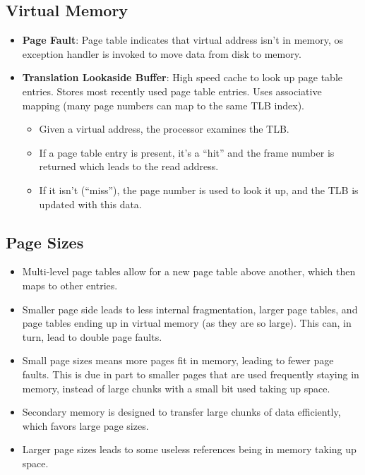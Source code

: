 \documentclass[fontsize=5pt]{scrartcl}
\begin{document}
\begin{multicols}{3}
    \section{Virtual Memory}
      \begin{itemize}
       \item \textbf{Page Fault}: Page table indicates that virtual address isn't in memory, os exception handler is invoked to move data from disk to memory.
       \item \textbf{Translation Lookaside Buffer}: High speed cache to look up page table entries. Stores most recently used page table entries. Uses associative mapping (many page
              numbers can map to the same TLB index).
       \begin{itemize}
          \item Given a virtual address, the processor examines the TLB.
          \item If a page table entry is present, it's a ``hit'' and the frame number is returned which leads to the read address.
          \item If it isn't (``miss''), the page number is used to look it up, and the TLB is updated with this data.
       \end{itemize}
      \end{itemize}
      \subsection{Page Sizes}
      \begin{itemize}
       \item Multi-level page tables allow for a new page table above another, which then maps to other entries. 
       \item Smaller page side leads to less internal fragmentation, larger page tables, and page tables ending up in virtual memory (as they are so large). This can, in turn, lead to double page faults.
       \item Small page sizes means more pages fit in memory, leading to fewer page faults. This is due in part to smaller pages that are used frequently staying in memory, instead of large chunks with a small bit
             used taking up space.
       \item Secondary memory is designed to transfer large chunks of data efficiently, which favors large page sizes.
       \item Larger page sizes leads to some useless references being in memory taking up space.
      \end{itemize}

\end{multicols}
\end{document}

